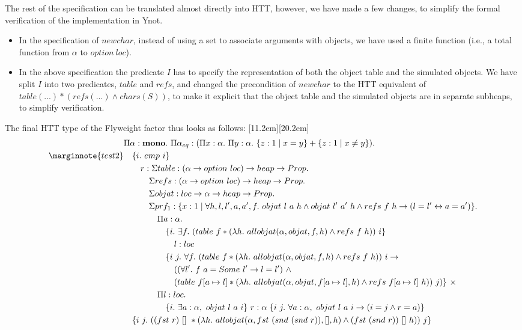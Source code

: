 \documentclass[a4paper,english]{article}
\newcommand{\HEAP}[0]{heap}
\newcommand{\PROP}[0]{Prop}
\newcommand{\MONO}[0]{\mathbf{mono}}
\newcommand{\LOC}[0]{loc}
\newcommand{\OPTION}[0]{option}
\newcommand{\pname}[1]{\texttt{/* #1 */}}
\begin{document}
The rest of the specification can be translated almost directly into HTT,
however, we have made a few changes, to simplify the formal verification of the
implementation in Ynot. 
\begin{itemize}
\item In the specification of $newchar$, instead of using a set to associate
arguments with objects, we have used a finite function (i.e., a total function
from $\alpha$ to $\OPTION\ \LOC$).
\item In the above specification the predicate $I$ has to specify the
representation of both the object table and the simulated objects. We have
split $I$ into two predicates, $table$ and $refs$, and changed the precondition
of $newchar$ to the HTT equivalent of $table(...) * (refs(...) \land
chars(S))$, to make it explicit that the object table and the simulated objects
are in separate subheaps, to simplify verification.
\end{itemize}
The final HTT type of the Flyweight factor thus looks as follows:
\marginnote{\pname{new}}[11.2em]\marginnote{\pname{get}}[20.2em]\begin{align*}
&\Pi \alpha : \MONO.\ \Pi \alpha_{eq} : (\Pi x : \alpha.\ \Pi y : \alpha.\ \{ z : 1 \mid x = y \} + \{ z : 1 \mid x \neq y \}).\\
\marginnote{test2}&\quad\{ i.\ emp\ i \}\\
&\quad\quad r : \Sigma table : (\alpha \rightarrow \OPTION\ \LOC) \rightarrow \HEAP \rightarrow \PROP.\\
&\quad\quad\quad \Sigma refs : (\alpha \rightarrow \OPTION\ \LOC) \rightarrow \HEAP \rightarrow \PROP.\\
&\quad\quad\quad \Sigma objat : \LOC \rightarrow \alpha \rightarrow \HEAP \rightarrow \PROP.\\
&\quad\quad\quad\Sigma prf_1 : \{ x : 1 \mid \forall h, l, l', a, a', f.\ objat\ l\ a\ h \land objat\ l'\ a'\ h \land refs\ f\ h \rightarrow (l = l' \leftrightarrow a = a') \}.\\
&\quad\quad\quad\quad \Pi a : \alpha.\\
&\quad\quad\quad\quad\quad \{ i.\ \exists f.\ (table\ f * (\lambda h.\ allobjat(\alpha, objat, f, h) \land refs\ f\ h))\ i \}\\
&\quad\quad\quad\quad\quad\quad l : \LOC\\
&\quad\quad\quad\quad\quad \{ i\ j.\ \forall f.\ (table\ f * (\lambda h.\ allobjat(\alpha, objat, f, h) \land refs\ f\ h))\ i \rightarrow\\
&\quad\quad\quad\quad\quad\quad ((\forall l'.\ f\ a = Some\ l' \rightarrow l = l')\ \land\\
&\quad\quad\quad\quad\quad\quad (table\ f[a \mapsto l] * (\lambda h.\ allobjat(\alpha, objat, f[a \mapsto l], h) \land refs\ f[a \mapsto l]\ h))\ j) \}\ \times\\
&\quad\quad\quad\quad \Pi l : loc.\\
&\quad\quad\quad\quad\quad \{ i.\ \exists a : \alpha,\ objat\ l\ a\ i \}\ r : \alpha\ \{ i\ j.\ \forall a : \alpha,\ objat\ l\ a\ i \rightarrow (i = j \land r = a) \}\\\
&\quad \{ i\ j.\ ((fst\ r)\ []\ * (\lambda h.\ allobjat(\alpha, fst\ (snd\ (snd\ r)), [], h) \land (fst\ (snd\ r))\ []\ h))\ j \}
\end{align*}
\end{document}
